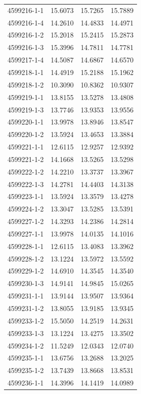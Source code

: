 \begin{longtable}{lrrr}
4599216-1-1 & 15.6073 & 15.7265 & 15.7889 \\
4599216-1-4 & 14.2610 & 14.4833 & 14.4971 \\
4599216-1-2 & 15.2018 & 15.2415 & 15.2873 \\
4599216-1-3 & 15.3996 & 14.7811 & 14.7781 \\
4599217-1-4 & 14.5087 & 14.6867 & 14.6570 \\
4599218-1-1 & 14.4919 & 15.2188 & 15.1962 \\
4599218-1-2 & 10.3090 & 10.8362 & 10.9307 \\
4599219-1-1 & 13.8155 & 13.5278 & 13.4808 \\
4599219-1-3 & 13.7746 & 13.9353 & 13.9556 \\
4599220-1-1 & 13.9978 & 13.8946 & 13.8547 \\
4599220-1-2 & 13.5924 & 13.4653 & 13.3884 \\
4599221-1-1 & 12.6115 & 12.9257 & 12.9392 \\
4599221-1-2 & 14.1668 & 13.5265 & 13.5298 \\
4599222-1-2 & 14.2210 & 13.3737 & 13.3967 \\
4599222-1-3 & 14.2781 & 14.4403 & 14.3138 \\
4599223-1-1 & 13.5924 & 13.3579 & 13.4278 \\
4599224-1-2 & 13.3047 & 13.5285 & 13.5391 \\
4599227-1-2 & 14.3293 & 14.2386 & 14.2814 \\
4599227-1-1 & 13.9978 & 14.0135 & 14.1016 \\
4599228-1-1 & 12.6115 & 13.4083 & 13.3962 \\
4599228-1-2 & 13.1224 & 13.5972 & 13.5592 \\
4599229-1-2 & 14.6910 & 14.3545 & 14.3540 \\
4599230-1-3 & 14.9141 & 14.9845 & 15.0265 \\
4599231-1-1 & 13.9144 & 13.9507 & 13.9364 \\
4599231-1-2 & 13.8055 & 13.9185 & 13.9345 \\
4599233-1-2 & 15.5050 & 14.2519 & 14.2631 \\
4599233-1-3 & 13.1224 & 13.4275 & 13.3502 \\
4599234-1-2 & 11.5249 & 12.0343 & 12.0740 \\
4599235-1-1 & 13.6756 & 13.2688 & 13.2025 \\
4599235-1-2 & 13.7439 & 13.8668 & 13.8531 \\
4599236-1-1 & 14.3996 & 14.1419 & 14.0989 \\

\end{longtable}
